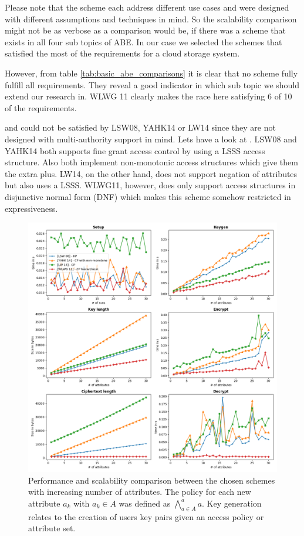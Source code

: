 Please note that the scheme each address different use cases and were designed with different assumptions and techniques in mind. So the scalability comparison might not be as verbose as a comparison would be, if there was a scheme that exists in all four sub topics of ABE. In our case we selected the schemes that satisfied the most of the requirements for a cloud storage system. 

However, from table \ref{tab:basic_abe_comparisons} it is clear that no scheme fully fulfill all requirements. They reveal a good indicator in which sub topic we should extend our research in. WLWG 11 clearly makes the race here satisfying 6 of 10 of the requirements. 

 and  could not be satisfied by LSW08, YAHK14 or LW14 since they are not designed with multi-authority support in mind. 
Lets have a look at . LSW08 and YAHK14 both supports fine grant access control by using a \ac{LSSS} access structure. Also both implement non-monotonic access structures which give them the extra plus. LW14, on the other hand, does not support negation of attributes but also uses a LSSS. WLWG11, however, does only support access structures in disjunctive normal form
 (\ac{DNF}) which makes this scheme somehow restricted in expressiveness. 

\begin{figure}[!ht]
\centering
    \includegraphics[width=1\linewidth]{img/basic_abe_comparisons.png}
    \caption{Performance and scalability comparison between the chosen schemes with increasing number of attributes. The policy for each new attribute $a_k$ with $a_k \in A$ was defined as $\bigwedge\limits_{a \in A}^a a$. Key generation relates to the creation of users key pairs given an access policy or attribute set.}
    \label{fig:basic_abe_comparison}
\end{figure}

